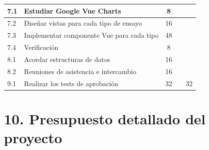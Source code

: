 \documentclass[11pt]{charter}
\begin{document}
\begin{table}[htpb]
\begin{tabular}{|l|l|c|c|c|}
7.1 & Estudiar Google Vue Charts & 8 &  &  \\ \hline
7.2 & Diseñar vistas para cada tipo de ensayo & 16 &  &  \\ \hline
7.3 & Implementar componente Vue para cada tipo & 48 &  &  \\ \hline
7.4 & Verificación & 8 &  &  \\ \hline
8.1 & Acordar estructuras de datos & 16 &  &  \\ \hline
8.2 & Reuniones de asistencia e intercambio & 16 &  &  \\ \hline
9.1 & Realizar los tests de aprobación & 32 &  & 32 \\ \hline
\end{tabular}
\end{table}


\section{10. Presupuesto detallado del proyecto}
\label{sec:presupuesto}
\end{document}
